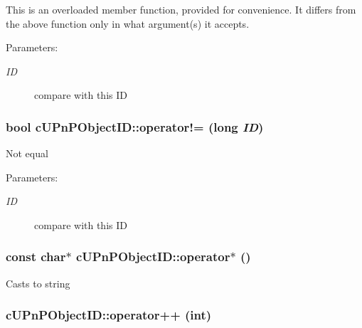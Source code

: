 This is an overloaded member function, provided for convenience. It differs from the above function only in what argument(s) it accepts. \begin{Desc}
\item[Parameters:]
\begin{description}
\item[{\em ID}]compare with this ID \end{description}
\end{Desc}
\hypertarget{structcUPnPObjectID_25b1f5cd4eb080cc4ab53731e1bd75f1}{
\subsubsection[{operator!=}]{\setlength{\rightskip}{0pt plus 5cm}bool cUPnPObjectID::operator!= (long {\em ID})}}
\label{structcUPnPObjectID_25b1f5cd4eb080cc4ab53731e1bd75f1}


Not equal \begin{Desc}
\item[Parameters:]
\begin{description}
\item[{\em ID}]compare with this ID \end{description}
\end{Desc}
\hypertarget{structcUPnPObjectID_33e67c6f297892763b5a4a41cd435490}{
\subsubsection[{operator$\ast$}]{\setlength{\rightskip}{0pt plus 5cm}const char$\ast$ cUPnPObjectID::operator$\ast$ ()}}
\label{structcUPnPObjectID_33e67c6f297892763b5a4a41cd435490}


Casts to string \hypertarget{structcUPnPObjectID_d46000a3acdd6f522bf3b86e48d47ddf}{
\subsubsection[{operator++}]{ cUPnPObjectID::operator++ (int)}}
\label{structcUPnPObjectID_d46000a3acdd6f522bf3b86e48d47ddf}


